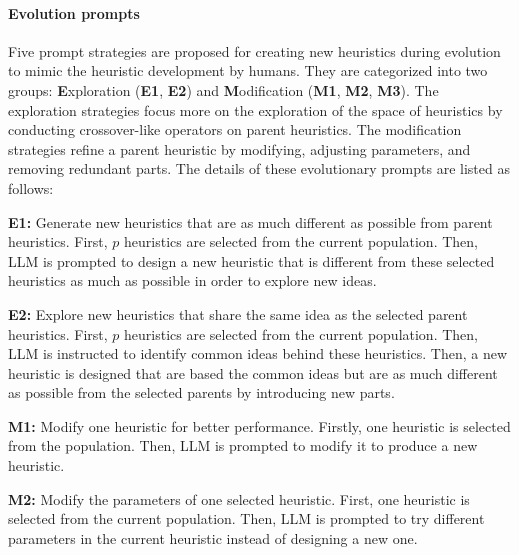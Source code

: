 

\paragraph{Evolution prompts}
Five prompt strategies are proposed for creating new heuristics during evolution to mimic the heuristic development by humans. They are categorized into two groups: \textbf{E}xploration (\textbf{E1}, \textbf{E2}) and \textbf{M}odification (\textbf{M1}, \textbf{M2}, \textbf{M3}). The exploration strategies focus more on the exploration of the space of heuristics by conducting crossover-like operators on parent heuristics. 
The modification strategies refine a parent heuristic by modifying, adjusting parameters, and removing redundant parts. The details of these evolutionary prompts are listed as follows:  


\textbf{E1:} Generate new heuristics that are as much different as possible from parent heuristics. First, $p$ heuristics are selected from the current population. Then, LLM is prompted to design a new heuristic that is different from these selected heuristics as much as possible in order to explore new ideas. 

\textbf{E2:} Explore new heuristics that share the same idea as the selected parent heuristics. First, $p$ heuristics are selected from the current population. Then, LLM is instructed to identify common ideas behind these heuristics. Then, a new heuristic is designed that are based the common ideas but are as much different as possible from the selected parents by introducing new parts. 

\textbf{M1:} Modify one heuristic for better performance. Firstly, one heuristic is selected from the population. Then, LLM is prompted to modify it to produce a new heuristic. 

\textbf{M2:} Modify the parameters of one selected heuristic. First, one heuristic is selected from the current population. Then, LLM is prompted to try different parameters in the current heuristic instead of designing a new one. %

